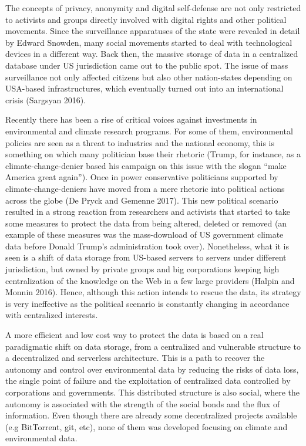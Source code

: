 \documentclass[conference,final,]{IEEEtran}
\begin{document}
The concepts of privacy, anonymity and digital self-defense are not only
restricted to activists and groups directly involved with digital rights
and other political movements. Since the surveillance apparatuses of the
state were revealed in detail by Edward Snowden, many social movements
started to deal with technological devices in a different way. Back
then, the massive storage of data in a centralized database under US
jurisdiction came out to the public spot. The issue of mass surveillance
not only affected citizens but also other nation-states depending on
USA-based infrastructures, which eventually turned out into an
international crisis (Sargsyan 2016).

Recently there has been a rise of critical voices against investments in
environmental and climate research programs. For some of them,
environmental policies are seen as a threat to industries and the
national economy, this is something on which many politician
base their rhetoric (Trump, for instance, as a climate-change-denier
based his campaign on this issue with the slogan ``make America great
again''). Once in power conservative politicians supported by
climate-change-deniers have moved from a mere rhetoric into
political actions across the globe (De Pryck and Gemenne 2017). This new
political scenario resulted in a strong reaction from researchers and
activists that started to take some measures to protect the
data from being altered, deleted or removed (an example of these
measures was the mass-download of US government climate data before
Donald Trump's administration took over). Nonetheless, what it is seen
is a shift of data storage from US-based servers to servers under
different jurisdiction, but owned by private groups and big corporations
keeping high centralization of the knowledge on the Web in a few large
providers (Halpin and Monnin 2016). Hence, although this action intends
to rescue the data, its strategy is very ineffective as the political
scenario is constantly changing in accordance with centralized interests.

A more efficient and low cost way to protect the data is based on a real
paradigmatic shift on data storage, from a centralized and vulnerable
structure to a decentralized and serverless architecture. This is a path
to recover the autonomy and control over environmental data by reducing
the risks of data loss, the single point of failure and the exploitation
of centralized data controlled by corporations and governments. This
distributed structure is also social, where the autonomy is associated
with the strength of the social bonds and the flux of information. Even 
though there are already some decentralized projects available (e.g
BitTorrent, git, etc), none of them was developed focusing on climate
and environmental data.
\end{document}
